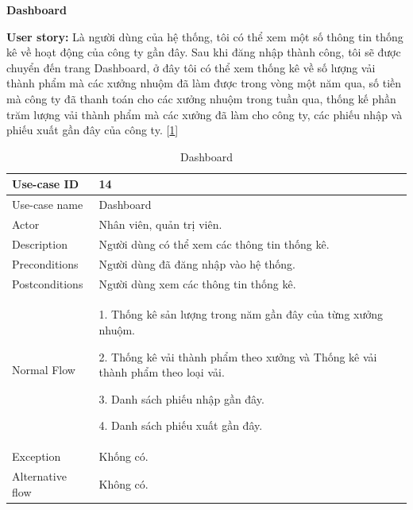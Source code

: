 \newpage
\textbf{Dashboard}\par
\textbf{User story:} Là người dùng của hệ thống, tôi có thể xem một số thông tin thống kê về hoạt động của công ty gần đây. Sau khi đăng nhập thành công, tôi sẽ được chuyển đến trang Dashboard, ở đây tôi có thể xem thống kê về số lượng vải thành phẩm mà các xưởng nhuộm đã làm được trong vòng một năm qua, số tiền mà công ty đã thanh toán cho các xưởng nhuộm trong tuần qua, thống kế phần trăm lượng vải thành phẩm mà các xưởng đã làm cho công ty, các phiếu nhập và phiếu xuất gần đây của công ty. [\ref{bang14}]
\begin{table}[!htp]
    \centering
    \begin{tabular}{|m{3cm}|m{10cm}|}
    \hline 
        Use-case ID & 14\\ \hline
        Use-case name & Dashboard\\ \hline
        Actor & Nhân viên, quản trị viên.\\ \hline
        Description & Người dùng có thể xem các thông tin thống kê.\\ \hline
        Preconditions & Người dùng đã đăng nhập vào hệ thống.\\ \hline
        Postconditions & Người dùng xem các thông tin thống kê.\\ \hline
        Normal Flow & 
        1. Thống kê sản lượng trong năm gần đây của từng xưởng nhuộm.\par
        2. Thống kê vải thành phẩm theo xưởng và Thống kê vải thành phẩm theo loại vải.\par
        3. Danh sách phiếu nhập gần đây.\par
        4. Danh sách phiếu xuất gần đây.
        \\ \hline
        Exception & Khống có.\\ \hline
        Alternative flow & Không có.\\ 
    \hline 
    \end{tabular}
    \caption{Dashboard}
    \label{bang14}
\end{table}

